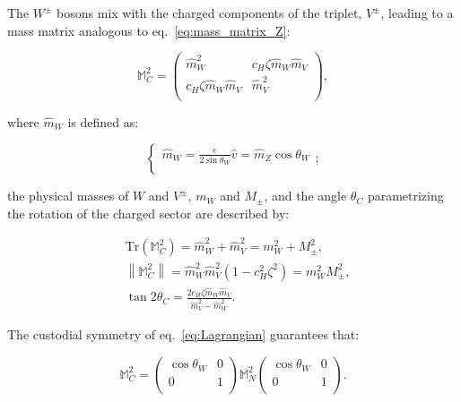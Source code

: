 \noindent The $W^{\pm}$ bosons mix with the charged components of the triplet, $V^{\pm}$, leading to a mass matrix analogous to eq.~\ref{eq:mass_matrix_Z}:

\begin{equation}
\mathbb{M}_C^2 =
\begin{pmatrix}
\hat{m}_W^2 & c_H \zeta \hat{m}_W \hat{m}_V \\
c_H \zeta \hat{m}_W \hat{m}_V & \hat{m}_V^2 \\
\end{pmatrix}
,
\label{eq:mass_matrix_Z}
\end{equation}

\noindent where $\hat{m}_W$ is defined as:

\begin{equation}
\left\{
\begin{array}{l}
\hat{m}_W = \frac{e}{2 \sin{\theta_W}} \hat{v} = \hat{m}_Z \cos{\theta_W} \\
\end{array};
\right.
\label{eq:mass_matrix_param_W}
\end{equation}

\noindent the physical masses of $W$ and $V^{\pm}$, $m_W$ and $M_{\pm}$, and the angle $\theta_C$ parametrizing the rotation of the charged sector are described by:

\begin{equation}
\begin{split}
 & \mbox{Tr}\left( \mathbb{M}_C^2 \right) = \hat{m}_W^2 + \hat{m}_V^2 = m_W^2 + M_{\pm}^2,\\
 & \left\| \mathbb{M}_C^2 \right\| = \hat{m}_W^2 \hat{m}_V^2 \left( 1 - c_H^2 {\zeta}^2\right) = m_W^2 M_{\pm}^2,\\
 & \tan{2 \theta_C} = \frac{2 c_H \zeta \hat{m}_W \hat{m}_V}{\hat{m}_V^2 - \hat{m}_W^2}.
\end{split}
\label{eq:mass_eig_W}
\end{equation}

\noindent The custodial symmetry of eq.~\ref{eq:Lagrangian} guarantees that:

\begin{equation}
\mathbb{M}_C^2 =
\begin{pmatrix}
\cos{{\theta}_W} & 0 \\
0 & 1 \\
\end{pmatrix}
\mathbb{M}_N^2
\begin{pmatrix}
\cos{{\theta}_W} & 0 \\
0 & 1 \\
\end{pmatrix}
.
\label{eq:custodial_matrix}
\end{equation}

